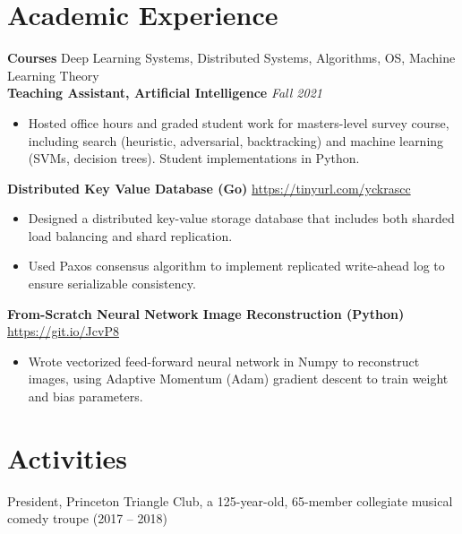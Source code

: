 \documentclass[11pt]{article}
\newcommand{\bfitentry}[2]{\vspace{0.5mm}\textbf{#1} \hfill \textit{#2}}
\newcommand{\bfitem}[2]{\textbf{#1} \quad #2}
\newcommand{\myproject}[2]{\vspace{1mm}\textbf{#1} \hfill \faGithub \hspace{1mm} \href{#2}{#2}}
\begin{document}
\section{Academic Experience}
\bfitem{Courses}{Deep Learning Systems, Distributed Systems, Algorithms, OS, Machine Learning Theory} \vspace{1mm} \\ %
\bfitentry{Teaching Assistant, Artificial Intelligence}{Fall 2021}
\begin{itemize}
    \item Hosted office hours and graded student work for masters-level survey course, including search (heuristic, adversarial, backtracking) and machine learning (SVMs, decision trees). Student implementations in Python.
\end{itemize}
\myproject{Distributed Key Value Database (Go)}{https://tinyurl.com/yckrascc}
\begin{itemize}
    \item Designed a distributed key-value storage database that includes both sharded load balancing and shard replication.
    \item Used Paxos consensus algorithm to implement replicated write-ahead log to ensure serializable consistency.
\end{itemize}
\myproject{From-Scratch Neural Network Image Reconstruction (Python)}{https://git.io/JcvP8}
\begin{itemize}
    \item Wrote vectorized feed-forward neural network in Numpy to reconstruct images, using Adaptive Momentum (Adam) gradient descent to train weight and bias parameters.
\end{itemize}

\iffalse
\myproject{Weighted Round-Robin CPU Task Scheduler}{https://git.io/JcvSs}
\begin{itemize}
    \item Modified Linux kernel v5.4 to replace default multi-core CPU task scheduling algorithm with a Weighted Round-Robin algorithm, allowing users to modify how long a task is on the CPU via system call using C.
\end{itemize}
\fi

\section{Activities}
President, Princeton Triangle Club, a 125-year-old, 65-member collegiate musical comedy troupe (2017 -- 2018)
\end{document}

